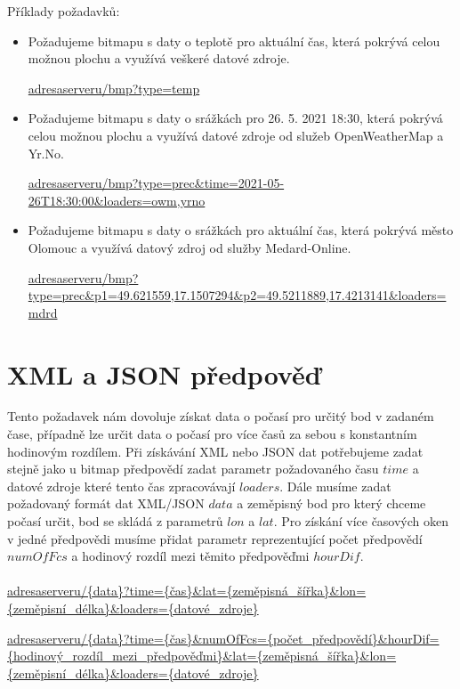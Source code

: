 \documentclass[czech,bachelor,dept460,male,csharp,cpdeclaration]{diploma}
\begin{document}
	Příklady požadavků:
	\begin{itemize}
		\item Požadujeme bitmapu s daty o teplotě pro aktuální čas, která pokrývá celou možnou plochu a využívá veškeré datové zdroje.
		
		\url{adresaserveru/bmp?type=temp}
		
		\item Požadujeme bitmapu s daty o srážkách pro 26. 5. 2021 18:30, která pokrývá celou možnou plochu a využívá datové zdroje od služeb OpenWeatherMap a Yr.No.
		
		\url{adresaserveru/bmp?type=prec\&time=2021-05-26T18:30:00\&loaders=owm,yrno}
		
		\item Požadujeme bitmapu s daty o srážkách pro aktuální čas, která pokrývá město Olomouc a využívá datový zdroj od služby Medard-Online.
		
		\url{adresaserveru/bmp?type=prec\&p1=49.621559,17.1507294\&p2=49.5211889,17.4213141\&loaders=mdrd}
	\end{itemize}
	
	\section{XML a JSON předpověď}
	
	Tento požadavek nám dovoluje získat data o počasí pro určitý bod v zadaném čase, případně lze určit data o počasí pro více časů za sebou s konstantním hodinovým rozdílem. Při získávání XML nebo JSON dat potřebujeme zadat stejně jako u bitmap předpovědí zadat parametr požadovaného času $time$ a datové zdroje které tento čas zpracovávají $loaders$. Dále musíme zadat požadovaný formát dat XML/JSON $data$ a zeměpisný bod pro který chceme počasí určit, bod se skládá z parametrů $lon$ a $lat$. Pro získání více časových oken v jedné předpovědi musíme přidat parametr reprezentující počet předpovědí $numOfFcs$ a hodinový rozdíl mezi těmito předpověďmi $hourDif$.
	\\\\
	\url{adresaserveru/{data}?time={čas}\&lat={zeměpisná\_šířka}\&lon={zeměpisní\_délka}\&loaders={datové\_zdroje}}
	
	\begin{flushleft}
		\url{adresaserveru/{data}?time={čas}\&numOfFcs={počet\_předpovědí}\&hourDif={hodinový\_rozdíl\_mezi\_předpověďmi}\&lat={zeměpisná\_šířka}\&lon={zeměpisní\_délka}\&loaders={datové\_zdroje}}
	\end{flushleft}
	
\end{document}
